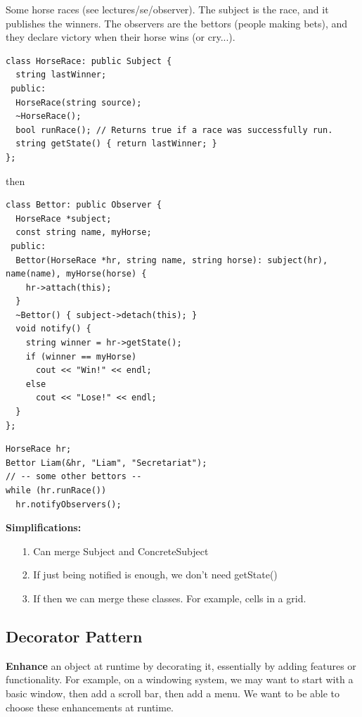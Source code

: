 \documentclass[english, 11pt]{article}
\begin{document}
\begin{exmp}
  Some horse races (see lectures/se/observer). The subject is the race, and it publishes the winners. The observers are the bettors (people making bets), and they declare victory when their horse wins (or cry...).

  \begin{lstlisting}[title=HorseFace.h]
class HorseRace: public Subject {
  string lastWinner;
 public:
  HorseRace(string source);
  ~HorseRace();
  bool runRace(); // Returns true if a race was successfully run.
  string getState() { return lastWinner; }
};
  \end{lstlisting}
  then
  \begin{lstlisting}[title=Bettor.h]
class Bettor: public Observer {
  HorseRace *subject;
  const string name, myHorse;
 public:
  Bettor(HorseRace *hr, string name, string horse): subject(hr), name(name), myHorse(horse) {
    hr->attach(this);
  }
  ~Bettor() { subject->detach(this); }
  void notify() {
    string winner = hr->getState();
    if (winner == myHorse)
      cout << "Win!" << endl;
    else
      cout << "Lose!" << endl;
  }
};
  \end{lstlisting}

  \begin{lstlisting}[title=main.cc]
HorseRace hr;
Bettor Liam(&hr, "Liam", "Secretariat");
// -- some other bettors --
while (hr.runRace())
  hr.notifyObservers();
  \end{lstlisting}
\end{exmp}

\textbf{Simplifications:} \\

\begin{itemize}
  \item[1.] Can merge Subject and ConcreteSubject
  \item[2.] If just being notified is enough, we don't need getState()
  \item[3.] If  then we can merge these classes. For example, cells in a grid.
\end{itemize}

\subsection{Decorator Pattern}

\textbf{Enhance} an object at runtime by decorating it, essentially by adding features or functionality. For example, on a windowing system, we may want to start with a basic window, then add a scroll bar, then add a menu. We want to be able to choose these enhancements at runtime. \\
\end{document}
